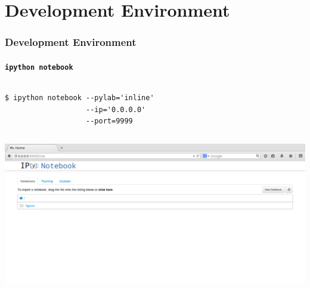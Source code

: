 \section{Development Environment}
\begin{frame}[fragile]
  \frametitle{Development Environment}
  \framesubtitle{\texttt{ipython notebook}}
  \begin{columns}[c]
      \lstset{tabsize=2,  language=Tex, basicstyle=\normalsize\ttfamily,
      breaklines=true, escapechar=*,  upquote=true}
      \begin{lstlisting}
$ ipython notebook --pylab='inline' 
                   --ip='0.0.0.0' 
                   --port=9999
\end{lstlisting}
    \end{columns}

    \vfill

    \begin{columns}[c]
      \begin{center}
\includegraphics[width=1.0\linewidth]{figures/ipython-notebook-with-cmd}\\
    \end{center}
  \end{columns}
\end{frame}

